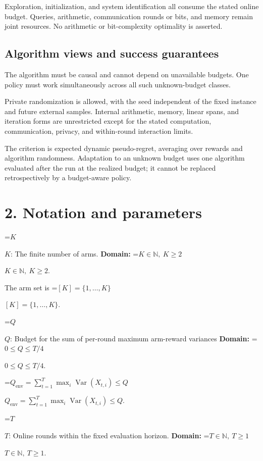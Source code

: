 \documentclass[10pt,a4paper]{article}
\newcommand{\AtlasMath}[1]{\par\begingroup\centering\setbox0=\hbox{$\displaystyle #1$}\ifdim\wd0>1.4\linewidth\typeout{ATLAS WIDE FORMULA: \the\wd0}\fi\ifdim\wd0>\linewidth\resizebox{\linewidth}{!}{\box0}\else\box0\fi\par\endgroup}
\newcommand{\AtlasInlineMath}[1]{\begingroup\setbox0=\hbox{$#1$}\ifdim\wd0>.4\linewidth\endgroup\AtlasMath{#1}\else\endgroup$#1$\fi}
\begin{document}
Exploration, initialization, and system identification all consume the stated online budget. Queries, arithmetic, communication rounds or bits, and memory remain joint resources. No arithmetic or bit-complexity optimality is asserted.



\subsection{Algorithm views and success guarantees}


The algorithm must be causal and cannot depend on unavailable budgets. One policy must work simultaneously across all such unknown-budget classes.



Private randomization is allowed, with the seed independent of the fixed instance and future external samples. Internal arithmetic, memory, linear spans, and iteration forms are unrestricted except for the stated computation, communication, privacy, and within-round interaction limits.



The criterion is expected dynamic pseudo-regret, averaging over rewards and algorithm randomness. Adaptation to an unknown budget uses one algorithm evaluated after the run at the realized budget; it cannot be replaced retrospectively by a budget-aware policy.



\section{2. Notation and parameters}


\AtlasInlineMath{K}: The finite number of arms. \textbf{Domain:} \AtlasInlineMath{K\in\mathbb N,\ K\ge2}.



The arm set is \AtlasInlineMath{[K]=\{1,\ldots,K\}}.



\AtlasInlineMath{Q}: Budget for the sum of per-round maximum arm-reward variances \textbf{Domain:} \AtlasInlineMath{0\le Q\le T/4}.



\AtlasInlineMath{Q_{\mathrm{env}}=\sum_{t=1}^T\max_i\operatorname{Var}(X_{t,i})\le Q}.



\AtlasInlineMath{T}: Online rounds within the fixed evaluation horizon. \textbf{Domain:} \AtlasInlineMath{T\in\mathbb N,\ T\ge1}.
\end{document}
